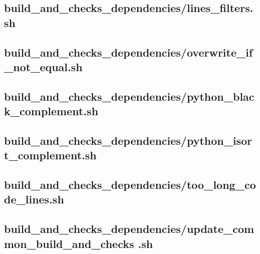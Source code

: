 \documentclass{article}
\begin{document}


\subsection{
  build\_and\_checks\_dependencies/lines\_filters.sh
}
\label{
  build_and_checks_dependencies:lines_filterssh
}



\subsection{
  build\_and\_checks\_dependencies/overwrite\_if\_not\_equal.sh
}
\label{
  build_and_checks_dependencies:overwrite_if_not_equalsh
}



\subsection{
  build\_and\_checks\_dependencies/python\_black\_complement.sh
}
\label{
  build_and_checks_dependencies:python_black_complementsh
}



\subsection{
  build\_and\_checks\_dependencies/python\_isort\_complement.sh
}
\label{
  build_and_checks_dependencies:python_isort_complementsh
}



\subsection{
  build\_and\_checks\_dependencies/too\_long\_code\_lines.sh
}
\label{
  build_and_checks_dependencies:too_long_code_linessh
}



\subsection{
  build\_and\_checks\_dependencies/update\_common\_build\_and\_checks%
.sh
}
\label{
  build_and_checks_dependencies:update_common_build_and_checkssh
}
\end{document}
